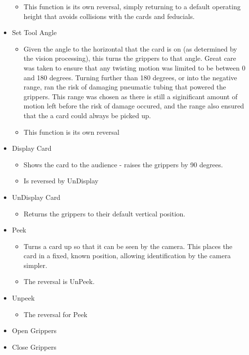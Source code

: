 \begin{itemize}
\begin{itemize}
		\item This function is its own reversal, simply returning to a default operating height that avoids collisions with the cards and feducials.
		\end{itemize}
	\item Set Tool Angle
		\begin{itemize}
		\item Given the angle to the horizontal that the card is on (as determined by the vision processing), this turns the grippers to that angle. Great care was taken to ensure that any twisting motion was limited to be between 0 and 180 degrees. Turning further than 180 degrees, or into the negative range, ran the risk of damaging pneumatic tubing that powered the grippers. This range was chosen as there is still a siginificant amount of motion left before the risk of damage occured, and the range also ensured that the a card could always be picked up.
		\item This function is its own reversal
		\end{itemize}
	\item Display Card
		\begin{itemize}
		\item Shows the card to the audience - raises the grippers by 90 degrees.
		\item Is reversed by UnDisplay
		\end{itemize}
	\item UnDisplay Card
		\begin{itemize}
		\item Returns the grippers to their default vertical position.
		\end{itemize}
	\item Peek
		\begin{itemize}
		\item Turns a card up so that it can be seen by the camera. This places the card in a fixed, known position, allowing identification by the camera simpler.
		\item The reversal is UnPeek. 
		\end{itemize}
	\item Unpeek
		\begin{itemize}
		\item The reversal for Peek
		\end{itemize}
	\item Open Grippers
	\item Close Grippers
	
\end{itemize}